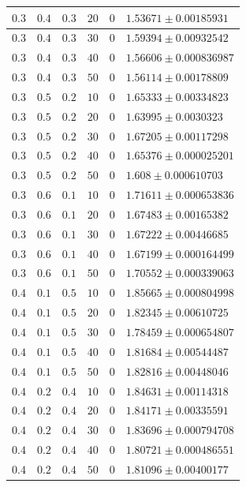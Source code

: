 \documentclass[14pt]{extreport}
\begin{document}
\begin{center}
\begin{longtable}{|p{1cm}|p{1cm}|p{1cm}|p{1cm}|p{1cm}|p{8cm}|}
$0.3$ & $0.4$ & $0.3$ & $20$ & $0$ & $1.53671 \pm 0.00185931$ \\ \hline
$0.3$ & $0.4$ & $0.3$ & $30$ & $0$ & $1.59394 \pm 0.00932542$ \\ \hline
$0.3$ & $0.4$ & $0.3$ & $40$ & $0$ & $1.56606 \pm 0.000836987$ \\ \hline
$0.3$ & $0.4$ & $0.3$ & $50$ & $0$ & $1.56114 \pm 0.00178809$ \\ \hline
$0.3$ & $0.5$ & $0.2$ & $10$ & $0$ & $1.65333 \pm 0.00334823$ \\ \hline
$0.3$ & $0.5$ & $0.2$ & $20$ & $0$ & $1.63995 \pm 0.0030323$ \\ \hline
$0.3$ & $0.5$ & $0.2$ & $30$ & $0$ & $1.67205 \pm 0.00117298$ \\ \hline
$0.3$ & $0.5$ & $0.2$ & $40$ & $0$ & $1.65376 \pm 0.000025201$ \\ \hline
$0.3$ & $0.5$ & $0.2$ & $50$ & $0$ & $1.608 \pm 0.000610703$ \\ \hline
$0.3$ & $0.6$ & $0.1$ & $10$ & $0$ & $1.71611 \pm 0.000653836$ \\ \hline
$0.3$ & $0.6$ & $0.1$ & $20$ & $0$ & $1.67483 \pm 0.00165382$ \\ \hline
$0.3$ & $0.6$ & $0.1$ & $30$ & $0$ & $1.67222 \pm 0.00446685$ \\ \hline
$0.3$ & $0.6$ & $0.1$ & $40$ & $0$ & $1.67199 \pm 0.000164499$ \\ \hline
$0.3$ & $0.6$ & $0.1$ & $50$ & $0$ & $1.70552 \pm 0.000339063$ \\ \hline
$0.4$ & $0.1$ & $0.5$ & $10$ & $0$ & $1.85665 \pm 0.000804998$ \\ \hline
$0.4$ & $0.1$ & $0.5$ & $20$ & $0$ & $1.82345 \pm 0.00610725$ \\ \hline
$0.4$ & $0.1$ & $0.5$ & $30$ & $0$ & $1.78459 \pm 0.000654807$ \\ \hline
$0.4$ & $0.1$ & $0.5$ & $40$ & $0$ & $1.81684 \pm 0.00544487$ \\ \hline
$0.4$ & $0.1$ & $0.5$ & $50$ & $0$ & $1.82816 \pm 0.00448046$ \\ \hline
$0.4$ & $0.2$ & $0.4$ & $10$ & $0$ & $1.84631 \pm 0.00114318$ \\ \hline
$0.4$ & $0.2$ & $0.4$ & $20$ & $0$ & $1.84171 \pm 0.00335591$ \\ \hline
$0.4$ & $0.2$ & $0.4$ & $30$ & $0$ & $1.83696 \pm 0.000794708$ \\ \hline
$0.4$ & $0.2$ & $0.4$ & $40$ & $0$ & $1.80721 \pm 0.000486551$ \\ \hline
$0.4$ & $0.2$ & $0.4$ & $50$ & $0$ & $1.81096 \pm 0.00400177$ \\ \hline

\end{longtable}
\end{center}
\end{document}
